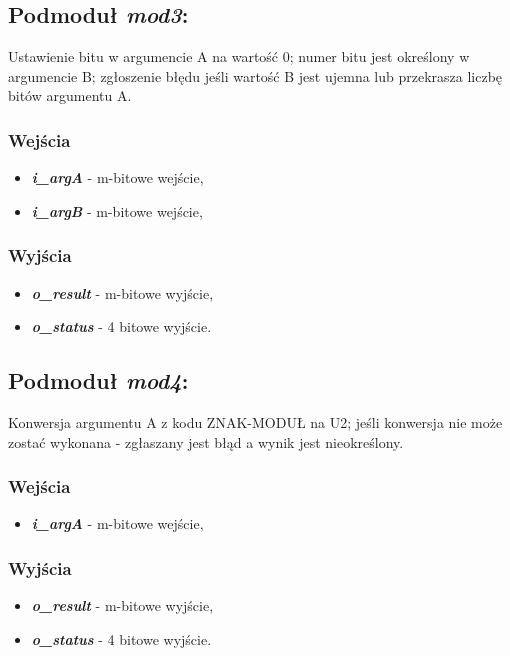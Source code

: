 \subsection{Podmoduł \emph{mod3}:}
Ustawienie bitu w argumencie A na wartość 0; numer bitu jest określony w argumencie B; zgłoszenie błędu jeśli wartość B jest ujemna lub przekrasza liczbę bitów argumentu A.

\subsubsection*{Wejścia}
\begin{itemize}
	\item \emph{\textbf{i\_argA}} - m-bitowe wejście,
	\item \emph{\textbf{i\_argB}} - m-bitowe wejście,
\end{itemize}
\subsubsection*{Wyjścia}
\begin{itemize}
	\item \emph{\textbf{o\_result}} - m-bitowe wyjście,
	\item \emph{\textbf{o\_status}} - 4 bitowe wyjście.
\end{itemize}

\subsection{Podmoduł \emph{mod4}:}
Konwersja argumentu A z kodu ZNAK-MODUŁ na U2; jeśli konwersja nie może zostać wykonana - zgłaszany jest błąd a wynik jest nieokreślony.

\subsubsection*{Wejścia}
\begin{itemize}
	\item \emph{\textbf{i\_argA}} - m-bitowe wejście,
\end{itemize}
\subsubsection*{Wyjścia}
\begin{itemize}
	\item \emph{\textbf{o\_result}} - m-bitowe wyjście,
	\item \emph{\textbf{o\_status}} - 4 bitowe wyjście.
\end{itemize}